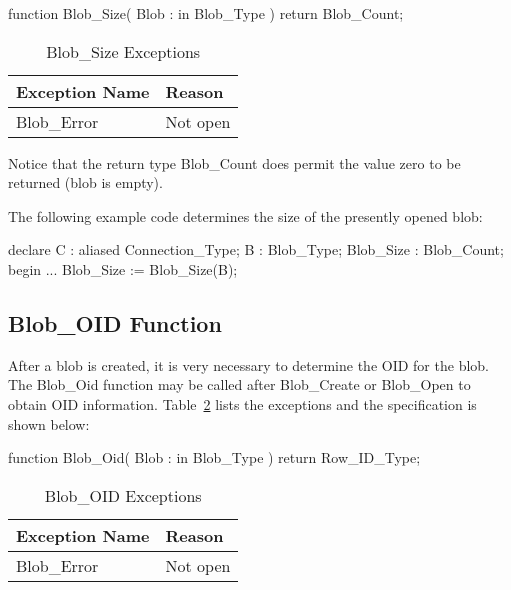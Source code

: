 \documentclass[english,letterpaper]{book}
\begin{document}
\begin{Code}
function Blob_Size(
   Blob : in Blob_Type
) return Blob_Count;
\end{Code}

\begin{table}
   \begin{center}
      \begin{tabular}{ll}
         Exception Name    &  Reason\\
         \hline 
         Blob\_Error       &  Not open\\
      \end{tabular}
   \end{center}
   \caption{Blob\_Size Exceptions}\label{t:blbszx}
\end{table}

Notice that the return type Blob\_Count does permit the value zero
to be returned (blob is empty).

The following example code determines the size of the presently opened
blob:

\begin{Example}
declare
   C :	       aliased Connection_Type;
   B :	       Blob_Type;
   Blob_Size : Blob_Count;
begin
   ...
   Blob_Size := Blob_Size(B);
\end{Example}

\subsection{Blob\_OID Function\label{Blob OID Function}}

After a blob is created, it is very necessary to determine the OID
for the blob. The Blob\_Oid function may be called after Blob\_Create
or Blob\_Open to obtain OID information.
Table~\ref{t:blboidx} lists the exceptions and the specification is
shown below:

\begin{Code}
function Blob_Oid(
   Blob : in Blob_Type
) return Row_ID_Type;
\end{Code}

\begin{table}
   \begin{center}
      \begin{tabular}{ll}
         Exception Name    &  Reason\\
         \hline 
         Blob\_Error       &  Not open\\
      \end{tabular}
   \end{center}
   \caption{Blob\_OID Exceptions}\label{t:blboidx}
\end{table}
\end{document}
